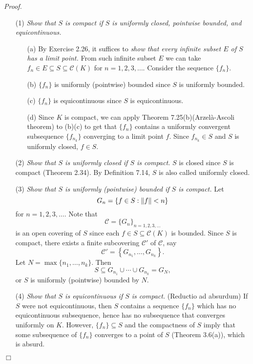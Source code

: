 \documentclass{article}
\begin{document}
\emph{Proof.}
\begin{enumerate}
\item[(1)]
  \emph{Show that $S$ is compact
  if $S$ is uniformly closed, pointwise bounded, and equicontinuous.}
  \begin{enumerate}
  \item[(a)]
    By Exercise 2.26, it suffices to
    \emph{show that every infinite subset $E$ of $S$ has a limit point.}
    From such infinite subset $E$ we can take
    $f_n \in E \subseteq S \subseteq \mathscr{C}(K)$ for $n = 1,2,3,\ldots$.
    Consider the sequence $\{f_n\}$.

  \item[(b)]
    $\{f_n\}$ is uniformly (pointwise) bounded since $S$ is uniformly bounded.

  \item[(c)]
    $\{f_n\}$ is equicontinuous since $S$ is equicontinuous.

  \item[(d)]
    Since $K$ is compact, we can apply Theorem 7.25(b)(Arzel\`{a}-Ascoli theorem)
    to (b)(c) to get that
    $\{f_n\}$ contains a uniformly convergent subsequence
    $\{f_{n_k}\}$ converging to a limit point $f$.
    Since $f_{n_k} \in S$ and $S$ is uniformly closed, $f \in S$.
  \end{enumerate}

\item[(2)]
  \emph{Show that $S$ is uniformly closed if $S$ is compact.}
  $S$ is closed since $S$ is compact (Theorem 2.34).
  By Definition 7.14, $S$ is also called uniformly closed.

\item[(3)]
  \emph{Show that $S$ is uniformly (pointwise) bounded if $S$ is compact.}
  Let
  \[
    G_n = \{ f \in S : \norm{f} < n \}
  \]
  for $n = 1,2,3,\ldots$.
  Note that
  \[
    \mathscr{C} = \{ G_n \}_{n=1,2,3,\ldots}
  \]
  is an open covering of $S$ since each $f \in S \subseteq \mathscr{C}(K)$ is bounded.
  Since $S$ is compact, there exists a finite subcovering $\mathscr{C}'$ of $\mathscr{C}$,
  say
  \[
    \mathscr{C}' = \left\{ G_{n_1}, \ldots, G_{n_k} \right\}.
  \]
  Let $N = \max\{n_1, \ldots, n_k\}$.
  Then
  \[
    S \subseteq G_{n_1} \cup \cdots \cup G_{n_k} = G_N,
  \]
  or $S$ is uniformly (pointwise) bounded by $N$.

\item[(4)]
  \emph{Show that $S$ is equicontinuous if $S$ is compact.}
  (Reductio ad absurdum)
  If $S$ were not equicontinuous,
  then $S$ contains a sequence $\{f_n\}$ which has no equicontinuous subsequence,
  hence has no subsequence that converges uniformly on $K$.
  However, $\{f_n\} \subseteq S$ and the compactness of $S$ imply that
  some subsequence of $\{f_n\}$ converges to a point of $S$ (Theorem 3.6(a)),
  which is absurd.
\end{enumerate}
$\Box$ \\\\
\end{document}
